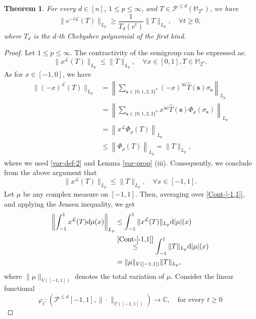 \documentclass{amsbook}
\newtheorem{theorem}{Theorem}[chapter]
\theoremstyle{definition}
\theoremstyle{remark}
\numberwithin{section}{chapter}
\numberwithin{equation}{chapter}
\newcommand{\1}{\mathbf{1}}
\newcommand{\s}{\mathbf{s}}
\begin{document}
\begin{theorem}\label{LB-C}
For every $ d \in [n]$, $1\leq p \leq\infty$,  and   $T\in \mathcal{P}^{\leq d}(\mathbb{M}_{2^n})$, we have
\begin{equation}\label{LBI-C}
\|e^{-t \mathcal{L}} (T)\|_{L_{p}} \geq \frac{1}{T_{d}(e^{t})}\|T\|_{L_{p}}, \quad \forall t \geq0,
\end{equation}
where $T_{d}$ is the $d$-th Chebyshev polynomial of the first kind.
\end{theorem}
\begin{proof} 
Let $1\leq p\leq \infty$. The contractivity of the semigroup can be expressed as: 
$$\big\|x^{\mathcal{L}} (T)\big\|_{L_{p}} \leq\|T\|_{L_{p}},\quad \forall x \in[0,1],T\in\mathbb{M}_{2^n}.$$  
As for $x \in [-1,0]$, we have
\begin{align*}
\big\|(-x)^{\mathcal{L}} (T)\big\|_{L_{p}}&=\left\|\sum_{\mathbf{s} \in \{0,1,2,3\}^n} (-x)^{|\s|}\widehat{T}(\mathbf{s}) \sigma_{\mathbf{s}}\right\|_{L_{p}}\\
&=\left\|\sum_{\mathbf{s} \in \{0,1,2,3\}^n} x^{|\s|}\widehat{T}(\mathbf{s}) \varPhi_\rho(\sigma_{\s})\right\|_{L_{p}}\\
&=\left\|x^{\mathcal{L}} \varPhi_\rho(T)\right\|_{L_{p}}\\
&\leq \left\| \varPhi_\rho(T)\right\|_{L_{p}}=\| T\|_{L_{p}},
\end{align*}
where we used \eqref{var-def-2} and Lemma  \ref{var-prop} (iii). Consequently, we conclude from the above argument that
\begin{equation}\label{Cont-[-1,1]}
\big\|x^{\mathcal{L}} (T)\big\|_{L_{p}} \leq\|T\|_{L_{p}},\quad\forall x \in[-1,1].
\end{equation}
Let $\mu$ be any complex measure on $[-1,1]$. Then, averaging over \eqref{Cont-[-1,1]}, and applying the Jensen inequality, we get
\begin{align}\label{AC}
\left\|\int_{-1}^{1} x^{\mathcal{L}} (T) d\mu(x)\right\|_{L_{p}} & \leq \int_{-1}^{1}\|x^{\mathcal{L}} (T)\|_{L_{p}} \mathrm{d}|\mu|(x) \nonumber\\
& \stackrel{\eqref{Cont-[-1,1]}}{\leq} \int_{-1}^{1}\|T\|_{L_{p}} \mathrm{d}|\mu|(x)\\
& =\|\mu\|_{V([-1,1])}\|T\|_{L_{p}},\nonumber
\end{align}
where  $\|\mu\|_{V([-1,1])}$ denotes the total variation of $\mu$. Consider the linear functional
$$
\varphi_{t}:(\mathcal{P}^{\leq d}[-1,1],\|\cdot\|_{\mathcal{C}([-1,1])}) \rightarrow \mathbb{C},\quad \mbox{for every $t\geq0$}
$$
\end{proof}
\end{document}
